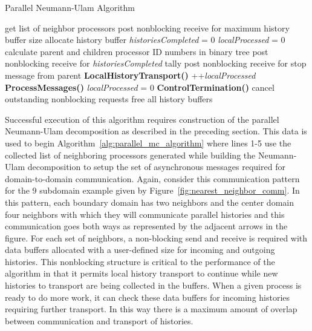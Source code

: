 \begin{algorithm}[h!]
  \caption{Parallel Neumann-Ulam Algorithm}
  \label{alg:parallel_mc_algorithm}
  \begin{algorithmic}[1]
    \State get list of neighbor processors 
    \State post nonblocking receive for maximum history buffer size
    \State allocate history buffer
    \EndFor
    \State \textit{historiesCompleted} = 0
    \State \textit{localProcessed} = 0
    \State calculate parent and children processor ID numbers in
    binary tree
    \State post nonblocking receive for \textit{historiesCompleted} tally
    \EndFor
    \State post nonblocking receive for stop message from parent
    \State \textbf{LocalHistoryTransport()}
    \State ++\textit{localProcessed}
    \EndIf
    \State \textbf{ProcessMessages()}
    \State \textit{localProcessed} = 0
    \EndIf
    \State \textbf{ControlTermination()}
    \EndIf
    \EndWhile
    \State cancel outstanding nonblocking requests
    \State free all history buffers
  \end{algorithmic}
\end{algorithm}

Successful execution of this algorithm requires construction of the
parallel Neumann-Ulam decomposition as described in the preceding
section. This data is used to begin
Algorithm~\ref{alg:parallel_mc_algorithm} where lines 1-5 use the
collected list of neighboring processors generated while building the
Neumann-Ulam decomposition to setup the set of asynchronous messages
required for domain-to-domain communication. Again, consider this
communication pattern for the 9 subdomain example given by
Figure~\ref{fig:nearest_neighbor_comm}. In this pattern, each boundary
domain has two neighbors and the center domain four neighbors with
which they will communicate parallel histories and this communication
goes both ways as represented by the adjacent arrows in the
figure. For each set of neighbors, a non-blocking send and receive is
required with data buffers allocated with a user-defined size for
incoming and outgoing histories. This nonblocking structure is
critical to the performance of the algorithm in that it permits local
history transport to continue while new histories to transport are
being collected in the buffers. When a given process is ready to do
more work, it can check these data buffers for incoming histories
requiring further transport. In this way there is a maximum amount of
overlap between communication and transport of histories.

